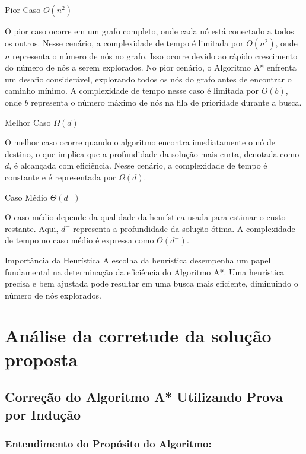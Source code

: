 Pior Caso \(O(n^2)\)

O pior caso ocorre em um grafo completo, onde cada nó está conectado a
todos os outros. Nesse cenário, a complexidade de tempo é limitada por
\(O(n^2)\), onde \(n\) representa o número de nós no grafo. Isso ocorre
devido ao rápido crescimento do número de nós a serem explorados. No
pior cenário, o Algoritmo A* enfrenta um desafio considerável,
explorando todos os nós do grafo antes de encontrar o caminho mínimo. A
complexidade de tempo nesse caso é limitada por \(O(b)\), onde \(b\)
representa o número máximo de nós na fila de prioridade durante a busca.

Melhor Caso \(\Omega(d)\)

O melhor caso ocorre quando o algoritmo encontra imediatamente o nó de
destino, o que implica que a profundidade da solução mais curta,
denotada como \(d\), é alcançada com eficiência. Nesse cenário, a
complexidade de tempo é constante e é representada por \(\Omega(d)\).

Caso Médio \(\Theta(d^-)\)

O caso médio depende da qualidade da heurística usada para estimar o
custo restante. Aqui, \(d^-\) representa a profundidade da solução
ótima. A complexidade de tempo no caso médio é expressa como
\(\Theta(d^-)\).

Importância da Heurística A escolha da heurística desempenha um papel
fundamental na determinação da eficiência do Algoritmo A*. Uma
heurística precisa e bem ajustada pode resultar em uma busca mais
eficiente, diminuindo o número de nós explorados.

\section{Análise da corretude da solução
proposta}\label{anuxe1lise-da-corretude-da-soluuxe7uxe3o-proposta}

\subsection{Correção do Algoritmo A* Utilizando Prova por
Indução}\label{correuxe7uxe3o-do-algoritmo-a-utilizando-prova-por-induuxe7uxe3o}

\subsubsection{Entendimento do Propósito do
Algoritmo:}\label{entendimento-do-propuxf3sito-do-algoritmo}

